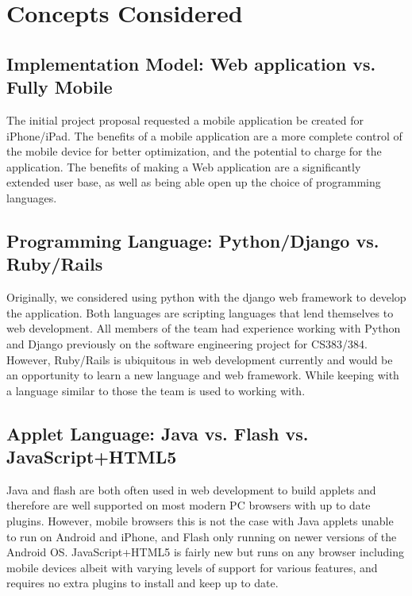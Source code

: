 \documentclass[12pt,english]{article}
\begin{document}
\clearpage
\section{Concepts Considered}

\subsection{Implementation Model: Web application vs. Fully Mobile}

The initial project proposal requested a mobile application be created
for iPhone/iPad.  The benefits of a mobile application are a more
complete control of the mobile device for better optimization, and
the potential to charge for the application.  The benefits of making
a Web application are a significantly extended user base, as well
as being able open up the choice of programming languages.


\subsection{Programming Language: Python/Django vs. Ruby/Rails}

Originally, we considered using python with the django web framework
to develop the application. Both languages are scripting languages
that lend themselves to web development. All members of the team had
experience working with Python and Django previously on the software
engineering project for CS383/384. However, Ruby/Rails is ubiquitous
in web development currently and would be an opportunity to learn
a new language and web framework. While keeping with a language
similar to those the team is used to working with.


\subsection{Applet Language: Java vs. Flash vs. JavaScript+HTML5 }

Java and flash are both often used in web development to build applets
and therefore are well supported on most modern PC browsers with up
to date plugins. However, mobile browsers this is not the case with
Java applets unable to run on Android and iPhone, and Flash only running
on newer versions of the Android OS. JavaScript+HTML5 is fairly new
but runs on any browser including mobile devices albeit with varying
levels of support for various features, and requires no extra plugins
to install and keep up to date.
\end{document}
